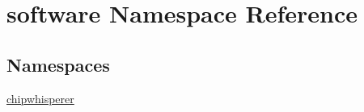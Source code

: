 \hypertarget{namespacesoftware}{}\section{software Namespace Reference}
\label{namespacesoftware}
\subsection*{Namespaces}
\begin{DoxyCompactItemize}
\item 
 \hyperlink{namespacesoftware_1_1chipwhisperer}{chipwhisperer}
\end{DoxyCompactItemize}
